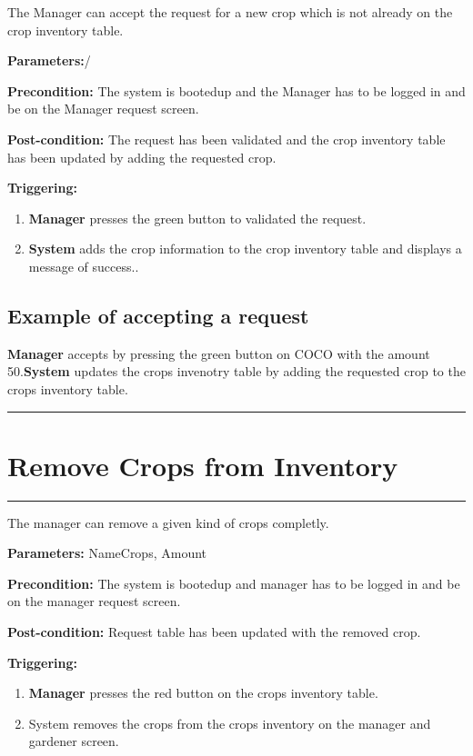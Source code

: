 The Manager can accept the request for a new crop which is not already on the
crop inventory table.
\begin{description}
\item \textbf{Parameters:}/
\item \textbf{Precondition:} The system is bootedup and the Manager has to be
logged in and be on the Manager request screen.
\item \textbf{Post-condition:} The request has been validated and the crop
inventory table has been updated by adding the requested crop.
\item \textbf{Triggering:}
\begin{enumerate}
\item \textbf{Manager} presses the green button to validated the request.
\item \textbf{System} adds the crop information to the crop inventory table and
displays a message of success..

\end{enumerate}
\end{description}

\subsection{Example of accepting a request}
\textbf{Manager} accepts by pressing the green button on COCO with the amount
50.\textbf{System} updates the crops invenotry table by adding the requested
crop to the crops inventory table.
\hfill
\vspace{0.5cm}
\hrule


\section{Remove Crops from Inventory}

\hrule
\hfill
\vspace{0.5cm}

\label{operation:RemoveCrops}

The manager can remove a given kind of crops completly.
\begin{description}

\item \textbf{Parameters:} NameCrops, Amount
\item \textbf{Precondition:} The system is bootedup and manager has to be
logged in and be on the manager request screen.
\item \textbf{Post-condition:} Request table has been updated with the removed
crop.

\item \textbf{Triggering:}
\begin{enumerate}
\item \textbf{Manager} presses the red button on the crops inventory table.
\item System removes the crops from the crops inventory on the manager and
gardener screen.
\end{enumerate}
\end{description}

